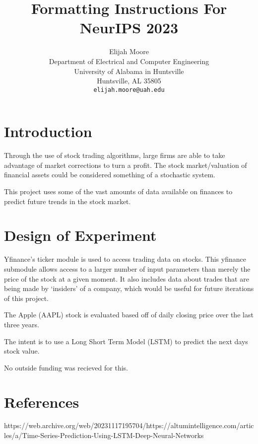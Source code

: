 \documentclass{article}
\title{Formatting Instructions For NeurIPS 2023}
\author{%
  Elijah Moore \\
  Department of Electrical and Computer Engineering\\
  University of Alabama in Huntsville\\
  Huntsville, AL 35805 \\
  \texttt{elijah.moore@uah.edu} \\
}
\begin{document}
\maketitle


\begin{abstract}
  
\end{abstract}

\section{Introduction}

    Through the use of stock trading algorithms, large firms are able to take advantage of market corrections
    to turn a profit. The stock market/valuation of financial assets could be considered something of a stochastic system.
   
    This project uses some of the vast amounts of data available on finances to
    predict future trends in the stock market.

\section{Design of Experiment}
    Yfinance's ticker module is used to access trading data on stocks.
    This yfinance submodule allows access to a larger number of input parameters than merely the price of the stock at a given moment.
    It also includes data about trades that are being made by `insiders' of a company, which would be useful for future iterations of this project.

    The Apple (AAPL) stock is evaluated based off of daily closing price over the last three years.

    The intent is to use a Long Short Term Model (LSTM) to predict the next days stock value.
    





\begin{ack}

    No outside funding was recieved for this.


\end{ack}


\section*{References}

https://web.archive.org/web/20231117195704/https://altumintelligence.com/articles/a/Time-Series-Prediction-Using-LSTM-Deep-Neural-Networks

{
\small

}

\end{document}
